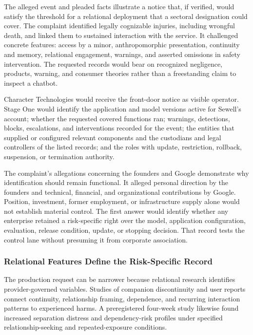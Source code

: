 The alleged event and pleaded facts illustrate a notice that, if verified, would satisfy the threshold for a relational deployment that a sectoral designation could cover. The complaint identified legally cognizable injuries, including wrongful death, and linked them to sustained interaction with the service. It challenged concrete features: access by a minor, anthropomorphic presentation, continuity and memory, relational engagement, warnings, and asserted omissions in safety intervention. The requested records would bear on recognized negligence, products, warning, and consumer theories rather than a freestanding claim to inspect a chatbot.

Character Technologies would receive the front-door notice as visible operator. Stage One would identify the application and model versions active for Sewell's account; whether the requested covered functions ran; warnings, detections, blocks, escalations, and interventions recorded for the event; the entities that supplied or configured relevant components and the custodians and legal controllers of the listed records; and the roles with update, restriction, rollback, suspension, or termination authority.

The complaint's allegations concerning the founders and Google demonstrate why identification should remain functional. It alleged personal direction by the founders and technical, financial, and organizational contributions by Google. Position, investment, former employment, or infrastructure supply alone would not establish material control. The first answer would identify whether any enterprise retained a risk-specific right over the model, application configuration, evaluation, release condition, update, or stopping decision. That record tests the control lane without presuming it from corporate association.

\subsubsection{Relational Features Define the Risk-Specific Record}

The production request can be narrower because relational research identifies provider-governed variables. Studies of companion discontinuity and user reports connect continuity, relationship framing, dependence, and recurring interaction patterns to experienced harms. A preregistered four-week study likewise found increased separation distress and dependency-risk profiles under specified relationship-seeking and repeated-exposure conditions.

